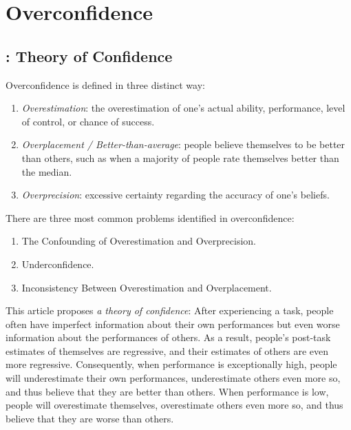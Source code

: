 \documentclass[11pt]{elegantbook}
\begin{document}
\chapter{Overconfidence}
\section{\cite{moore2008trouble}: Theory of Confidence}
Overconfidence is defined in three distinct way:
\begin{enumerate}
    \item \textit{Overestimation}: the overestimation of one's actual ability, performance, level of control, or chance of success.
    \item \textit{Overplacement / Better-than-average}:  people believe themselves to be better than others, such as when a majority of people rate themselves better than the median.
    \item \textit{Overprecision}: excessive certainty regarding the accuracy of one's beliefs.
\end{enumerate}

There are three most common problems identified in overconfidence:
\begin{enumerate}
    \item The Confounding of Overestimation and Overprecision.
    \item Underconfidence.
    \item Inconsistency Between Overestimation and Overplacement.
\end{enumerate}

This article proposes \textit{a theory of confidence}: After experiencing a task, people often have imperfect information about their own performances but even worse information about the performances of others. As a result, people's post-task estimates of themselves are regressive, and their estimates of others are even more regressive. Consequently, when performance is exceptionally high, people will underestimate their own performances, underestimate others even more so, and thus believe that they are better than others. When performance is low, people will overestimate themselves, overestimate others even more so, and thus believe that they are worse than others.
\end{document}
